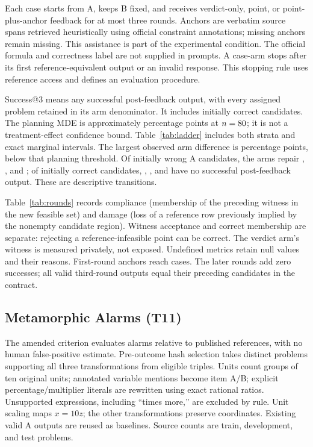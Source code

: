 Each case starts from A, keeps B fixed, and receives verdict-only, point, or point-plus-anchor feedback for at most three rounds. Anchors are verbatim source spans retrieved heuristically using official constraint annotations; missing anchors remain missing. This assistance is part of the experimental condition. The official formula and correctness label are not supplied in prompts. A case-arm stops after its first reference-equivalent output or an invalid response. This stopping rule uses reference access and defines an evaluation procedure.

Success@3 means any successful post-feedback output, with every assigned problem retained in its arm denominator. It includes initially correct candidates. The planning MDE is approximately \PlanningMDE{} percentage points at $n=80{}$; it is not a treatment-effect confidence bound. Table~\ref{tab:ladder} includes both strata and exact marginal intervals. The largest observed arm difference is \ObservedGap{} percentage points, below that planning threshold. Of \InitiallyWrong{} initially wrong A candidates, the arms repair \VerdictRepair{}, \PointRepair{}, and \AnchorRepair{}; of \InitiallyCorrect{} initially correct candidates, \VerdictLost{}, \PointLost{}, and \AnchorLost{} have no successful post-feedback output. These are descriptive transitions.

Table~\ref{tab:rounds} records compliance (membership of the preceding witness in the new feasible set) and damage (loss of a reference row previously implied by the nonempty candidate region). Witness acceptance and correct membership are separate: rejecting a reference-infeasible point can be correct. The verdict arm's witness is measured privately, not exposed. Undefined metrics retain null values and their reasons. First-round anchors reach \AnchorExposed{} cases. The later rounds add zero successes; all valid third-round outputs equal their preceding candidates in the contract.

\subsection{Metamorphic Alarms (T11)}
The amended criterion evaluates alarms relative to published references, with no human false-positive estimate. Pre-outcome hash selection takes \MetaN{} distinct problems supporting all three transformations from \SupportedN{} eligible triples. Units count groups of ten original units; annotated variable mentions become item A/B; explicit percentage/multiplier literals are rewritten using exact rational ratios. Unsupported expressions, including ``times more,'' are excluded by rule. Unit scaling maps $x=10z$; the other transformations preserve coordinates. Existing valid A outputs are reused as baselines. Source counts are \MetaTrain{} train, \MetaDev{} development, and \MetaTest{} test problems.

